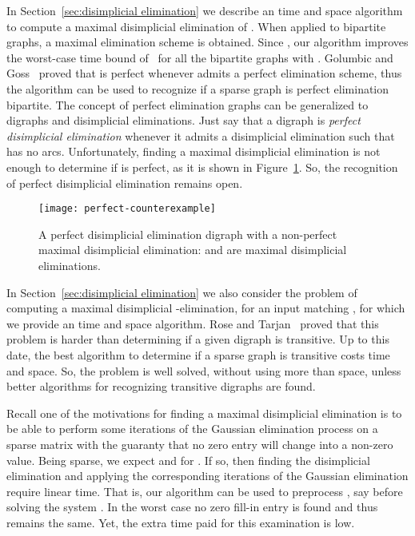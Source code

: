 \documentclass[a4paper,11pt]{article}
\begin{document}
In Section~\ref{sec:disimplicial elimination} we describe an  time and  space algorithm to compute a maximal disimplicial elimination of .  When applied to bipartite graphs, a maximal elimination scheme  is obtained.  Since , our algorithm improves the worst-case time bound of~\cite{Bomhoff2011} for all the bipartite graphs with .  Golumbic and Goss~\cite{GolumbicGossJGT1978} proved that  is perfect whenever  admits a perfect elimination scheme, thus the algorithm can be used to recognize if a sparse graph is perfect elimination bipartite.  The concept of perfect elimination graphs can be generalized to digraphs and disimplicial eliminations.  Just say that a digraph  is \emph{perfect disimplicial elimination} whenever it admits a disimplicial elimination  such that  has no arcs.  Unfortunately, finding a maximal disimplicial elimination is not enough to determine if  is perfect, as it is shown in Figure~\ref{fig:maximal not perfect}.  So, the recognition of perfect disimplicial elimination remains open.

\begin{figure}
  \centering
  \texttt{[image: perfect-counterexample]}
  \caption{A perfect disimplicial elimination digraph with a non-perfect maximal disimplicial elimination:  and  are maximal disimplicial eliminations.}\label{fig:maximal not perfect}
\end{figure}

In Section~\ref{sec:disimplicial elimination} we also consider the problem of computing a maximal disimplicial -elimination, for an input matching , for which we provide an  time and  space algorithm.  Rose and Tarjan~\cite{RoseTarjanSJAM1978} proved that this problem is harder than determining if a given digraph is transitive.  Up to this date, the best algorithm to determine if a sparse graph is transitive costs  time and  space.  So, the problem is well solved, without using more than  space, unless better algorithms for recognizing transitive digraphs are found.

Recall one of the motivations for finding a maximal disimplicial elimination is to be able to perform some iterations of the Gaussian elimination process on a sparse matrix  with the guaranty that no zero entry will change into a non-zero value.  Being  sparse, we expect  and  for .  If so, then finding the disimplicial elimination and applying the corresponding iterations of the Gaussian elimination require linear time.  That is, our algorithm can be used to preprocess , say before solving the system .  In the worst case no zero fill-in entry is found and thus  remains the same.  Yet, the extra time paid for this examination is low.
\end{document}
